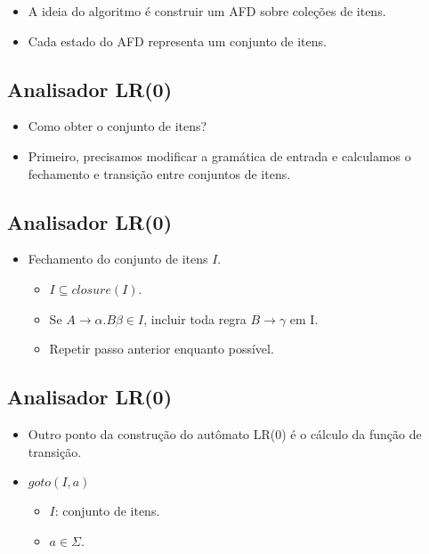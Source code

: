 \documentclass[11pt]{article}
\begin{document}
\begin{itemize}
\item A ideia do algoritmo é construir um AFD sobre coleções de itens.

\item Cada estado do AFD representa um conjunto de itens.
\end{itemize}
\subsection*{Analisador LR(0)}
\label{sec:org42e4bc5}

\begin{itemize}
\item Como obter o conjunto de itens?

\item Primeiro, precisamos modificar a gramática de entrada e calculamos o fechamento e
transição entre conjuntos de itens.
\end{itemize}
\subsection*{Analisador LR(0)}
\label{sec:org30dc8ec}

\begin{itemize}
\item Fechamento do conjunto de itens \(I\).
\begin{itemize}
\item \(I\subseteq closure(I)\).
\item Se \(A \to \alpha \textbf{.}B\beta \in I\), incluir toda regra \(B \to \gamma\) em I.
\item Repetir passo anterior enquanto possível.
\end{itemize}
\end{itemize}
\subsection*{Analisador LR(0)}
\label{sec:orgaa463cc}

\begin{itemize}
\item Outro ponto da construção do autômato LR(0) é o cálculo da função de transição.

\item \(goto(I,a)\)
\begin{itemize}
\item \(I\): conjunto de itens.
\item \(a \in \Sigma\).
\end{itemize}
\end{itemize}
\end{document}
